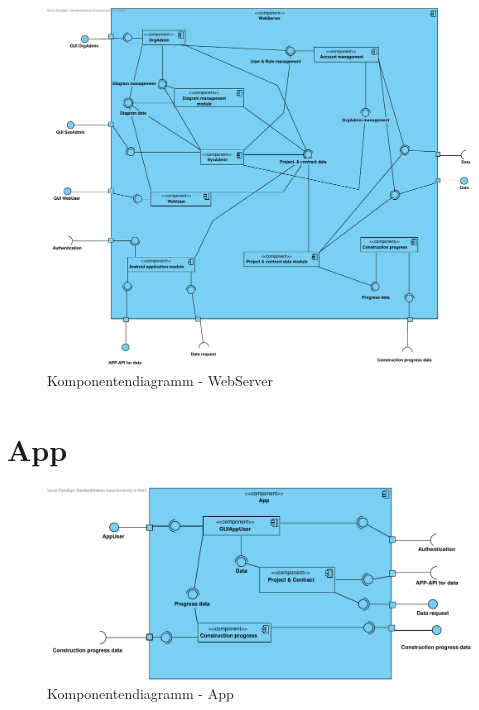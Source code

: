 \begin{figure}[h]
	\centering
	\includegraphics[width=16cm]{img/diagrams/Component-WebServer.pdf}	
	\caption{Komponentendiagramm - WebServer}
	\label{fig:komponentendiagramm-webserver}
\end{figure}

\section{App}

\begin{figure}[h]
	\centering
	\includegraphics[width=16cm]{img/diagrams/Component-App.pdf}	
	\caption{Komponentendiagramm - App}
	\label{fig:komponentendiagramm-app}
\end{figure}

\newpage

